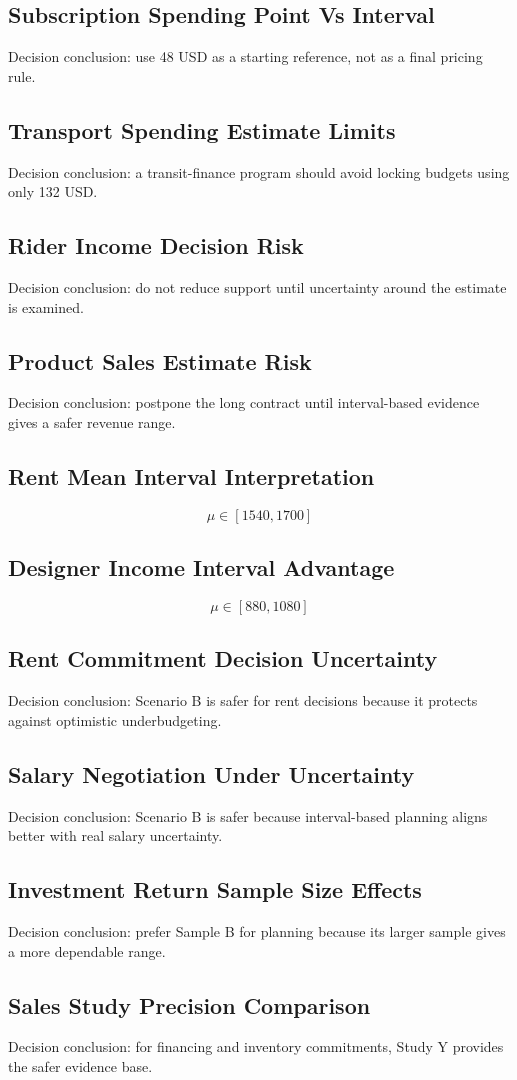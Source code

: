 \subsection*{Subscription Spending Point Vs Interval}
Decision conclusion: use 48 USD as a starting reference, not as a final pricing rule.

\subsection*{Transport Spending Estimate Limits}
Decision conclusion: a transit-finance program should avoid locking budgets using only 132 USD.

\subsection*{Rider Income Decision Risk}
Decision conclusion: do not reduce support until uncertainty around the estimate is examined.

\subsection*{Product Sales Estimate Risk}
Decision conclusion: postpone the long contract until interval-based evidence gives a safer revenue range.

\subsection*{Rent Mean Interval Interpretation}
\[\mu \in [1540,1700]\]

\subsection*{Designer Income Interval Advantage}
\[\mu \in [880,1080]\]

\subsection*{Rent Commitment Decision Uncertainty}
Decision conclusion: Scenario B is safer for rent decisions because it protects against optimistic underbudgeting.

\subsection*{Salary Negotiation Under Uncertainty}
Decision conclusion: Scenario B is safer because interval-based planning aligns better with real salary uncertainty.

\subsection*{Investment Return Sample Size Effects}
Decision conclusion: prefer Sample B for planning because its larger sample gives a more dependable range.

\subsection*{Sales Study Precision Comparison}
Decision conclusion: for financing and inventory commitments, Study Y provides the safer evidence base.


